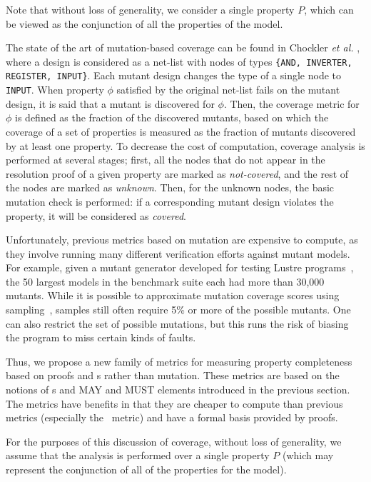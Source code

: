\noindent Note that without loss of generality, we consider a single property $P$, which can be viewed as the conjunction of all the properties of the model.

The state of the art of mutation-based coverage can be found in Chockler \textit{et al.} \cite{chockler2010coverage}, where a design is considered as a net-list with nodes of types {\small \texttt{\{AND, INVERTER, REGISTER, INPUT\}}}.
Each mutant design changes the type of a single node to {\small \texttt{INPUT}}. When property $\phi$ satisfied by the original net-list fails on the mutant design, it is said that a mutant is discovered for $\phi$. Then, the coverage metric for $\phi$ is defined as the fraction of the discovered mutants, based on which the coverage of a set of properties is measured as the fraction of mutants discovered by at least one property.
To decrease the cost of computation, coverage analysis is performed at several stages; first, all the nodes that do not appear in the resolution proof of a given property are marked as \emph{not-covered}, and the rest of the nodes are marked as \emph{unknown}. Then, for the unknown nodes, the basic mutation check is performed: if a corresponding mutant design violates the property, it will be considered as \emph{covered}.
\fi

Unfortunately, previous metrics based on mutation are expensive to compute, as they involve running many different verification efforts against mutant models.  For example, given a mutant generator developed for testing Lustre programs~\cite{jkind}, the 50 largest models in the benchmark suite each had more than 30,000 mutants.  While it is possible to approximate mutation coverage scores using sampling~\cite{Zhang13:sampling}, samples still often require 5\% or more of the possible mutants.  One can also restrict the set of possible mutations, but this runs the risk of biasing the program to miss certain kinds of faults.

Thus, we propose a new family of metrics for measuring property completeness based on proofs and \mivc s rather than mutation.  These metrics are based on the notions of \mivc s and MAY and MUST elements introduced in the previous section.  The metrics have benefits in that they are cheaper to compute than previous metrics (especially the \mivc\ metric) and have a formal basis provided by proofs.

For the purposes of this discussion of coverage, without loss of generality, we assume that the analysis is performed over a single property $P$ (which may represent the conjunction of all of the properties for the model).

